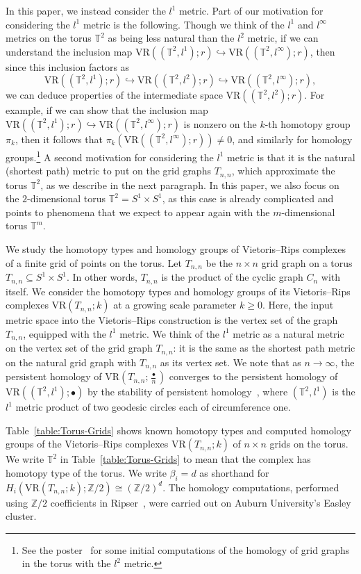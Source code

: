 \documentclass[12pt,a4paper]{amsart}
\theoremstyle{definition}
\newcommand{\T}{\ensuremath{\mathbb{T}}}
\newcommand{\Z}{\ensuremath{\mathbb{Z}}}
\newcommand{\vr}[2]{\mathrm{VR}(#1;#2)}
\numberwithin{equation}{section}
\begin{document}
In this paper, we instead consider the $l^1$ metric.
Part of our motivation for considering the $l^1$ metric is the following.
Though we think of the $l^1$ and $l^\infty$ metrics on the torus $\T^2$ as being less natural than the $l^2$ metric, if we can understand the inclusion map $\vr{(\T^2,l^1)}{r}\hookrightarrow \vr{(\T^2,l^\infty)}{r}$, then since this inclusion factors as
\[\vr{(\T^2,l^1)}{r}\hookrightarrow \vr{(\T^2,l^2)}{r}\hookrightarrow \vr{(\T^2,l^\infty)}{r},\]
we can deduce properties of the intermediate space $\vr{(\T^2,l^2)}{r}$.
For example, if we can show that the inclusion map $\vr{(\T^2,l^1)}{r}\hookrightarrow \vr{(\T^2,l^\infty)}{r}$ is nonzero on the $k$-th homotopy group $\pi_k$, then it follows that $\pi_k(\vr{(\T^2,l^\infty)}{r})\neq 0$, and similarly for homology groups.\footnote{See the poster~\cite{coyle2025vietoris} for some initial computations of the homology of grid graphs in the torus with the $l^2$ metric.}
A second motivation for considering the $l^1$ metric is that it is the natural (shortest path) metric to put on the grid graphs $T_{n,n}$, which approximate the torus $\T^2$, as we describe in the next paragraph.
In this paper, we also focus on the $2$-dimensional torus $\T^2 = S^1 \times S^1$, as this case is already complicated and points to phenomena that we expect to appear again with the $m$-dimensional torus $\T^m$.

We study the homotopy types and homology groups of Vietoris--Rips complexes of a finite grid of points on the torus.
Let $T_{n,n}$ be the $n\times n$ grid graph on a torus $T_{n,n}\subseteq S^{1}\times S^{1}$.
In other words, $T_{n,n}$ is the product of the cyclic graph $C_{n}$ with itself.
We consider the homotopy types and homology groups of its Vietoris--Rips complexes $\vr{T_{n,n}}{k}$ at a growing scale parameter $k\ge 0$.
Here, the input metric space into the Vietoris--Rips construction is the vertex set of the graph $T_{n,n}$, equipped with the $l^1$ metric.
We think of the $l^1$ metric as a natural metric on the vertex set of the grid graph $T_{n,n}$: it is the same as the shortest path metric on the natural grid graph with $T_{n,n}$ as its vertex set.
We note that as $n\to \infty$, the persistent homology of $\vr{T_{n,n}}{\frac{\bullet}{n}}$ converges to the persistent homology of $\vr{(\T^2,l^1)}{\bullet}$ by the stability of persistent homology~\cite{ChazalDeSilvaOudot2014}, where $(\T^2,l^1)$ is the $l^1$ metric product of two geodesic circles each of circumference one.

Table~\ref{table:Torus-Grids} shows known homotopy types and computed homology groups of the Vietoris--Rips complexes $\vr{T_{n,n}}{k}$ of $n\times n$ grids on the torus.
We write $\T^2$ in Table~\ref{table:Torus-Grids} to mean that the complex has homotopy type of the torus.
We write $\beta_i=d$ as shorthand for $H_i(\vr{T_{n,n}}{k};\Z/2)\cong (\Z/2)^d$.
The homology computations, performed using $\Z/2$ coefficients in Ripser~\cite{bauer2021ripser}, were carried out on Auburn University's Easley cluster.
\end{document}
